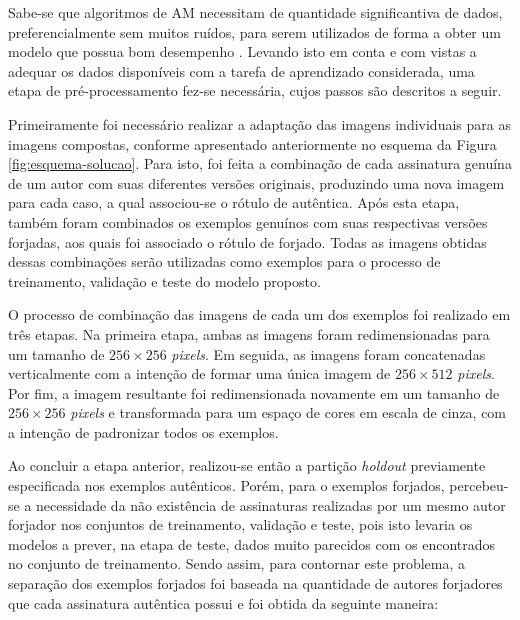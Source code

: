 
Sabe-se que algoritmos de AM necessitam de quantidade significantiva de dados, preferencialmente sem muitos ruídos, para serem utilizados de forma a obter um modelo que possua bom desempenho \cite{marsland}. Levando isto em conta e com vistas a adequar os dados disponíveis com a tarefa de aprendizado considerada, uma etapa de pré-processamento fez-se necessária, cujos passos são descritos a seguir.

Primeiramente foi necessário realizar a adaptação das imagens individuais para as imagens compostas, conforme apresentado anteriormente no esquema da Figura \ref{fig:esquema-solucao}. Para isto, foi feita a combinação de cada assinatura genuína de um autor com suas diferentes versões originais, produzindo uma nova imagem para cada caso, a qual associou-se o rótulo de autêntica. Após esta etapa, também foram combinados os exemplos genuínos com suas respectivas versões forjadas, aos quais foi associado o rótulo de forjado. Todas as imagens obtidas dessas combinações serão utilizadas como exemplos para o processo de treinamento, validação e teste do modelo proposto.

O processo de combinação das imagens de cada um dos exemplos foi realizado em três etapas. Na primeira etapa, ambas as imagens foram redimensionadas para um tamanho de $256 \times 256$ \emph{pixels}. Em seguida, as imagens foram concatenadas verticalmente com a intenção de formar uma única imagem de $256 \times 512$ \emph{pixels}. Por fim, a imagem resultante foi redimensionada novamente em um tamanho de $256 \times 256$ \emph{pixels} e transformada para um espaço de cores em escala de cinza, com a intenção de padronizar todos os exemplos.


Ao concluir a etapa anterior, realizou-se então a partição \emph{holdout} previamente especificada nos exemplos autênticos. Porém, para o exemplos forjados, percebeu-se a necessidade da não existência de assinaturas realizadas por um mesmo autor forjador nos conjuntos de treinamento, validação e teste, pois isto levaria os modelos a prever, na etapa de teste, dados muito parecidos com os encontrados no conjunto de treinamento. Sendo assim, para contornar este problema, a separação dos exemplos forjados foi baseada na quantidade de autores forjadores que cada assinatura autêntica possui e foi obtida da seguinte maneira:

